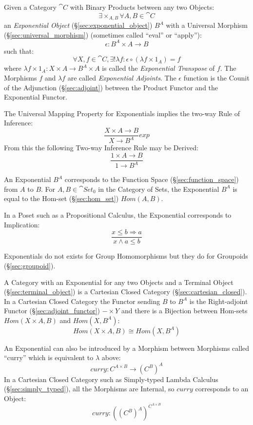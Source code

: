 Given a Category $\cat{C}$ with Binary Products between any two
Objects:
\[
  \exists \times_{A,B} \forall A,B \in \cat{C}
\]
an \emph{Exponential Object} (\S\ref{sec:exponential_object}) $B^A$
with a Universal Morphism (\S\ref{sec:universal_morphism}) (sometimes
called ``eval'' or ``apply''):
\[
  \epsilon : B^A \times A \rightarrow B
\]
such that:
\[
  \forall X, f \in \cat{C}, \exists ! \lambda f :
  \epsilon \circ (\lambda f \times 1_A) = f
\]
where $\lambda f \times 1_A : X \times A \rightarrow B^A \times A$ is
called the \emph{Exponential Transpose} of $f$. The Morphisms $f$ and
$\lambda f$ are called \emph{Exponential Adjoints}. The $\epsilon$
function is the Counit of the Adjunction (\S\ref{sec:adjoint}) between
the Product Functor and the Exponential Functor.

The Universal Mapping Property for Exponentials implies the two-way
Rule of Inference:
\[
  {
    \frac{X \times A \rightarrow B}
    {X \rightarrow B^A}
  }exp
\]
From this the following Two-way Inference Rule may be Derived:
\[
    \frac{1 \times A \rightarrow B}
    {1 \rightarrow B^A}
\]

An Exponential $B^A$ corresponds to the Function Space
(\S\ref{sec:function_space}) from $A$ to $B$. For $A,B \in
\cat{Set}_0$ in the Category of Sets, the Exponential $B^A$ is
equal to the Hom-set (\S\ref{sec:hom_set}) $Hom(A,B)$.

In a Poset such as a Propositional Calculus, the Exponential
corresponds to Implication:
\[
    \frac{x \leq b \Rightarrow a}
    {x \wedge a \leq b}
\]

Exponentials do not exists for Group Homomorphisms but they do for
Groupoids (\S\ref{sec:groupoid}).

A Category with an Exponential for any two Objects and a Terminal
Object (\S\ref{sec:terminal_object}) is a Cartesian Closed Category
(\S\ref{sec:cartesian_closed}). In a Cartesian Closed Category the
Functor sending $B$ to $B^A$ is the Right-adjoint Functor
(\S\ref{sec:adjoint_functor}) $- \times Y$ and there is a Bijection
between Hom-sets $Hom(X \times A, B)$ and $Hom(X, B^A)$:
\[
  Hom(X \times A, B) \cong Hom(X, B^A)
\]

An Exponential can also be introduced by a Morphism between Morphisms
called ``curry'' which is equivalent to $\lambda$ above:
\[
  curry : C^{A \times B} \rightarrow (C^B)^A
\]
In a Cartesian Closed Category such as Simply-typed Lambda Calculus
(\S\ref{sec:simply_typed}), all the Morphisms are Internal, so $curry$
corresponds to an Object:
\[
  curry : ((C^B)^A)^{C^{A \times B}}
\]



